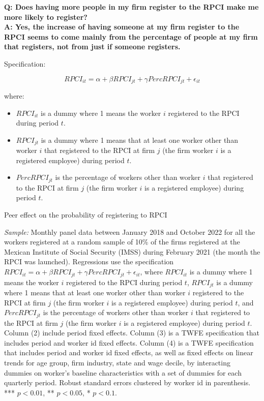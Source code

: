 \documentclass[oneside,11pt]{article}
\begin{document}
\normalsize

\clearpage

\textbf{Q: Does having more people in my firm register to the RPCI make me more likely to register?}
\\
\textbf{A: Yes, the increase of having someone at my firm register to the RPCI seems to come mainly from the percentage of people at my firm that registers, not from just if someone registers.}

Specification:

$$RPCI_{it} = \alpha + \beta RPCI_{jt} + \gamma Perc RPCI_{jt} + \epsilon_{it}$$

where:

\begin{itemize}
    \item $RPCI_{it}$ is a dummy where 1 means the worker $i$ registered to the RPCI during period $t$.
    \item $RPCI_{jt}$ is a dummy where 1 means that at least one worker other than worker $i$ that registered to the RPCI at firm $j$ (the firm worker $i$ is a registered employee) during period $t$.
    \item $PercRPCI_{jt}$ is the percentage of workers other than worker $i$ that registered to the RPCI at firm $j$ (the firm worker $i$ is a registered employee) during period $t$.
\end{itemize}

\begin{table}[H]
    \caption{Peer effect on the probability of registering to RPCI}
    \label{peer_rpci_rfc_rpci_dum}
    \begin{center}
    \scriptsize{}
    \end{center}
\end{table}

\scriptsize{
\noindent \textit{Sample:} Monthly panel data between January 2018 and October 2022 for all the workers registered at a random sample of 10\% of the firms registered at the Mexican Institute of Social Security (IMSS) during February 2021 (the month the RPCI was launched). Regressions use the specification $RPCI_{it} = \alpha + \beta RPCI_{jt} + \gamma Perc RPCI_{jt} + \epsilon_{it}$, where $RPCI_{it}$ is a dummy where 1 means the worker $i$ registered to the RPCI during period $t$, $RPCI_{jt}$ is a dummy where 1 means that at least one worker other than worker $i$ registered to the RPCI at firm $j$ (the firm worker $i$ is a registered employee) during period $t$, and $PercRPCI_{jt}$ is the percentage of workers other than worker $i$ that registered to the RPCI at firm $j$ (the firm worker $i$ is a registered employee) during period $t$. Column (2) include period fixed effects. Column (3) is a TWFE specification that includes period and worker id fixed effects. Column (4) is a TWFE specification that includes period and worker id fixed effects, as well as fixed effects on linear trends for age group, firm industry, state and wage decile, by interacting dummies on worker's baseline characteristics with a set of dummies for each quarterly period. Robust standard errors clustered by worker id in parenthesis. *** $p<0.01$, ** $p<0.05$, * $p<0.1$.}
\end{document}
